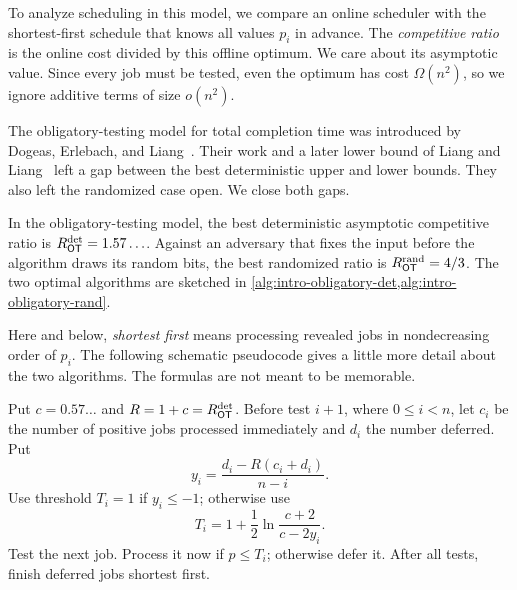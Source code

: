 To analyze scheduling in this model, we compare an online scheduler with the shortest-first schedule that knows
all values $p_i$ in advance.  The \emph{competitive ratio} is the online cost
divided by this offline optimum.  We care about its asymptotic value.  Since
every job must be tested, even the optimum has cost $\Omega(n^2)$, so we
ignore additive terms of size $o(n^2)$.

The obligatory-testing model for total completion time was introduced by
Dogeas, Erlebach, and Liang~\cite{DogeasErlebachLiang2024}.  Their work and a
later lower bound of Liang and Liang~\cite{LiangLiang2026} left a gap between
the best deterministic upper and lower bounds.  They also left the randomized
case open.  We close both gaps.

\begin{theorem}
\label{thm:intro-obligatory}
In the obligatory-testing model, the best deterministic asymptotic
competitive ratio is $R_{\mathsf{OT}}^{\mathrm{det}}=1.57\ldots$.  Against an adversary
that fixes the input before the algorithm draws its random bits, the best
randomized ratio is $R_{\mathsf{OT}}^{\mathrm{rand}}=4/3$.  The two optimal algorithms are sketched in
\cref{alg:intro-obligatory-det,alg:intro-obligatory-rand}.
\end{theorem}

Here and below, \emph{shortest first} means processing revealed jobs in
nondecreasing order of $p_i$.  The following schematic pseudocode gives a
little more detail about the two algorithms.  The formulas are not meant to
be memorable.

\begin{algorithm}[H]
\caption{}
\label{alg:intro-obligatory-det}
\begin{algorithmic}
\State Put $c=0.57\ldots$ and $R=1+c=R_{\mathsf{OT}}^{\mathrm{det}}$.
\State Before test $i+1$, where $0\le i<n$, let $c_i$ be the number of
positive jobs processed immediately and $d_i$ the number deferred.
\State Put
\[
 y_i=\frac{d_i-R(c_i+d_i)}{n-i}.
\]
\State Use threshold $T_i=1$ if $y_i\le-1$; otherwise use
\[
 T_i=1+\frac12\ln\frac{c+2}{c-2y_i}.
\]
\State Test the next job.  Process it now if $p\le T_i$; otherwise defer it.
\State After all tests, finish deferred jobs shortest first.
\end{algorithmic}
\end{algorithm}

